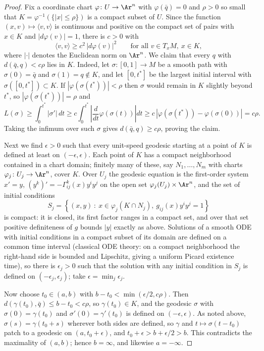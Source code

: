 \begin{proof}
Fix a coordinate chart $\varphi\colon U\rightarrow \Ar^n$ with
$\varphi(\bar q)=0$ and $\rho>0$ so small that
$K=\varphi^{-1}(\{|x|\le\rho\})$ is a compact subset of $U$. Since
the function $(x,v)\mapsto\langle v,v\rangle$ is continuous and
positive on the compact set of pairs with $x\in K$ and
$|d\varphi(v)|=1$, there is $c>0$ with
$$\langle v,v\rangle\ge c^2\,|d\varphi(v)|^2
\qquad\text{for all } v\in T_xM,\ x\in K,$$
where $|\cdot|$ denotes the Euclidean norm on $\Ar^n$. We claim
that every $q$ with $d(\bar q,q)<c\rho$ lies in $K$. Indeed, let
$\sigma\colon[0,1]\rightarrow M$ be a smooth path with
$\sigma(0)=\bar q$ and $\sigma(1)=q\notin K$, and let $[0,t^*]$ be
the largest initial interval with $\sigma([0,t^*])\subset K$. If
$|\varphi(\sigma(t^*))|<\rho$ then $\sigma$ would remain in $K$
slightly beyond $t^*$, so $|\varphi(\sigma(t^*))|=\rho$ and
$$L(\sigma)\ge\int_0^{t^*}|\sigma'|\,dt
\ge c\int_0^{t^*}\left|\frac{d}{dt}\varphi(\sigma(t))\right|dt
\ge c\,|\varphi(\sigma(t^*))-\varphi(\sigma(0))|=c\rho.$$
Taking the infimum over such $\sigma$ gives $d(\bar q,q)\ge
c\rho$, proving the claim.

Next we find $\epsilon>0$ such that every unit-speed geodesic
starting at a point of $K$ is defined at least on
$(-\epsilon,\epsilon)$. Each point of $K$ has a compact
neighborhood contained in a chart domain; finitely many of these,
say $N_1,\ldots,N_m$ with charts $\varphi_j\colon
U_j\rightarrow\Ar^n$, cover $K$. Over $U_j$ the geodesic equation
is the first-order system $x'=y$,
$(y^k)'=-\Gamma^{k}_{ij}(x)y^iy^j$ on the open set
$\varphi_j(U_j)\times\Ar^n$, and the set of initial conditions
$$S_j=\left\{(x,y)\ :\ x\in\varphi_j(K\cap N_j),\
g_{ij}(x)y^iy^j=1\right\}$$
is compact: it is closed, its first factor ranges in a compact
set, and over that set positive definiteness of $g$ bounds $|y|$
exactly as above. Solutions of a smooth ODE with initial
conditions in a compact subset of its domain are defined on a
common time interval (classical ODE theory: on a compact
neighborhood the right-hand side is bounded and Lipschitz, giving
a uniform Picard existence time), so there is $\epsilon_j>0$ such
that the solution with any initial condition in $S_j$ is defined
on $(-\epsilon_j,\epsilon_j)$; take
$\epsilon=\min_j\epsilon_j$.

Now choose $t_0\in(a,b)$ with $b-t_0<\min(\epsilon/2,c\rho)$.
Then $d(\gamma(t_0),\bar q)\le b-t_0<c\rho$, so
$\gamma(t_0)\in K$, and the geodesic $\sigma$ with
$\sigma(0)=\gamma(t_0)$ and $\sigma'(0)=\gamma'(t_0)$ is defined
on $(-\epsilon,\epsilon)$. As noted above,
$\sigma(s)=\gamma(t_0+s)$ wherever both sides are defined, so
$\gamma$ and $t\mapsto\sigma(t-t_0)$ patch to a geodesic on
$(a,t_0+\epsilon)$, and $t_0+\epsilon>b+\epsilon/2>b$. This
contradicts the maximality of $(a,b)$; hence $b=\infty$, and
likewise $a=-\infty$.


\end{proof}
